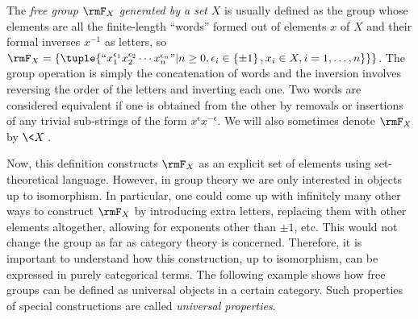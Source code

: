 \begin{defn}
    The \emph{free group} $\rmF_{X}$ \emph{generated by a set} $X$
    is usually defined as the group whose elements are all the finite-length
    ``words'' formed out of elements $x$ of $X$ and their formal inverses
    $x^{-1}$ as letters, so $\rmF_{X}=\left\{ \tuple{``x_{1}^{\epsilon_{1}}x_{2}^{\epsilon_{2}}\cdots x_{n}^{\epsilon_{n}}"|n\geq0,\epsilon_{i}\in\left\{ \pm1\right\} ,x_{i}\in X,i=1,\ldots,n\}}\right\} $.
    The group operation is simply the concatenation of words and the inversion
    involves reversing the order of the letters and inverting each one. Two words are considered equivalent if one is obtained from the other by removals or insertions of any trivial sub-strings of the form $x^{\epsilon}x^{-\epsilon}$. We will also sometimes denote $\rmF_X$ by $\<X\>$.
\end{defn}
Now, this definition constructs $\rmF_{X}$ as an explicit set of elements
using set-theoretical language. However, in group theory we are only
interested in objects up to isomorphism. In particular, one could
come up with infinitely many other ways to construct $\rmF_{X}$ by introducing
extra letters, replacing them with other elements altogether, allowing for exponents other than $\pm 1$, etc. This
would not change the group as far as category theory is concerned.
Therefore, it is important to understand how this construction, up
to isomorphism, can be expressed in purely categorical terms. The
following example shows how free groups can be defined as universal
objects in a certain category. Such properties of special constructions
are called \emph{universal properties}.
